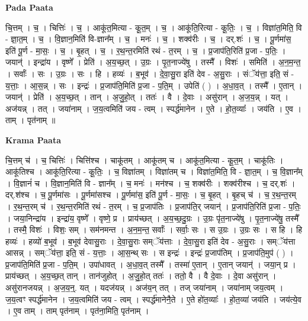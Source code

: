 \documentclass[17pt]{extarticle}
\begin{document}
\textbf{Pada Paata} \newline

चि॒त्तम् । च॒ । चित्तिः॑ । च॒ । आकू॑त॒मित्या - कू॒त॒म् । च॒ । आकू॑ति॒रित्या - कू॒तिः॒ । च॒ । विज्ञा॑त॒मिति॒ वि - ज्ञा॒त॒म् । च॒ । वि॒ज्ञान॒मिति॑ वि-ज्ञान᳚म् । च॒ । मनः॑ । च॒ । शक्व॑रीः । च॒ । दर्.शः॑ । च॒ । पू॒र्णमा॑स॒ इति॑ पू॒र्ण - मा॒सः॒ । च॒ । बृ॒हत् । च॒ । र॒थ॒न्त॒रमिति॑ रथं - त॒रम् । च॒ । प्र॒जाप॑ति॒रिति॑ प्र॒जा - प॒तिः॒ । जयान्॑ । इन्द्रा॑य । वृष्णे᳚ । प्रेति॑ । अ॒य॒च्छ॒त् । उ॒ग्रः । पृ॒त॒नाज्ये॑षु । तस्मै᳚ । विशः॑ । समिति॑ । अ॒न॒म॒न्त॒ । सर्वाः᳚ । सः । उ॒ग्रः । सः । हि । हव्यः॑ । ब॒भूव॑ । दे॒वा॒सु॒रा इति॑ देव - अ॒सु॒राः । संॅय॑त्ता॒ इति॒ सं - य॒त्ताः॒ । आ॒स॒न्न् । सः । इन्द्रः॑ । प्र॒जाप॑ति॒मिति॑ प्र॒जा - प॒ति॒म् । उपेति॑ ( ) । अ॒धा॒व॒त् । तस्मै᳚ । ए॒तान् । जयान्॑ । प्रेति॑ । अ॒य॒च्छ॒त् । तान् । अ॒जु॒हो॒त् । ततः॑ । वै । दे॒वाः । असु॑रान् । अ॒ज॒य॒न्न् । यत् । अज॑यन्न् । तत् । जया॑नाम् । ज॒य॒त्वमिति॑ जय - त्वम् । स्पर्द्ध॑मानेन । ए॒ते । हो॒त॒व्याः᳚ । जय॑ति । ए॒व । ताम् । पृत॑नाम् ॥  \newline


\textbf{Krama Paata} \newline

चि॒त्तम् च॑ । च॒ चित्तिः॑ । चित्ति॑श्च । चाकू॑तम् । आकू॑तम् च । आकू॑त॒मित्या - कू॒त॒म् । चाकू॑तिः । आकू॑तिश्च । आकू॑ति॒रित्या - कू॒तिः॒ । च॒ विज्ञा॑तम् । विज्ञा॑तम् च । विज्ञा॑त॒मिति॒ वि - ज्ञा॒त॒म् । च॒ वि॒ज्ञान᳚म् । वि॒ज्ञानं॑ च । वि॒ज्ञान॒मिति॑ वि - ज्ञान᳚म् । च॒ मनः॑ । मन॑श्च । च॒ शक्व॑रीः । शक्व॑रीश्च । च॒ दर्.शः॑ । दर्.श॑श्च । च॒ पू॒र्णमा॑सः । पू॒र्णमा॑सश्च । पू॒र्णमा॑स॒ इति॑ पू॒र्ण - मा॒सः॒ । च॒ बृ॒हत् । बृ॒हच् च॑ । च॒ र॒थ॒न्त॒रम् । र॒थ॒न्त॒रम् च॑ । र॒थ॒न्त॒रमिति॑ रथं - त॒रम् । च॒ प्र॒जाप॑तिः । प्र॒जाप॑ति॒र् जयान्॑ । प्र॒जाप॑ति॒रिति॑ प्र॒जा - प॒तिः॒ । जया॒निन्द्रा॑य । इन्द्रा॑य॒ वृष्णे᳚ । वृष्णे॒ प्र । प्राय॑च्छत् । अ॒य॒च्छ॒दु॒ग्रः । उ॒ग्रः पृ॑त॒नाज्ये॑षु । पृ॒त॒नाज्ये॑षु॒ तस्मै᳚ । तस्मै॒ विशः॑ । विशः॒ सम् । सम॑नमन्त । अ॒न॒म॒न्त॒ सर्वाः᳚ । सर्वाः॒ सः । स उ॒ग्रः । उ॒ग्रः सः । स हि । हि हव्यः॑ । हव्यो॑ ब॒भूव॑ । ब॒भूव॑ देवासु॒राः । दे॒वा॒सु॒राः सम्ॅय॑त्ताः । दे॒वा॒सु॒रा इति॑ देव - अ॒सु॒राः । सम्ॅय॑त्ता आसन्न् । सम्ॅय॑त्ता॒ इति॒ सं - य॒त्ताः॒ । आ॒स॒न्थ् सः । स इन्द्रः॑ । इन्द्रः॑ प्र॒जाप॑तिम् । प्र॒जाप॑ति॒मुप॑ ( ) । प्र॒जाप॑ति॒मिति॑ प्र॒जा - प॒ति॒म् । उपा॑धावत् । अ॒धा॒व॒त् तस्मै᳚ । तस्मा॑ ए॒तान् । ए॒तान् जयान्॑ । जया॒न् प्र । प्राय॑च्छत् । अ॒य॒च्छ॒त् तान् । तान॑जुहोत् । अ॒जु॒हो॒त् ततः॑ । ततो॒ वै । वै दे॒वाः । दे॒वा असु॑रान् । असु॑रानजयन्न् । अ॒ज॒य॒न्॒. यत् । यदज॑यन्न् । अज॑य॒न् तत् । तज् जया॑नाम् । जया॑नाम् जय॒त्वम् । ज॒य॒त्वꣳ स्पर्द्ध॑मानेन । ज॒य॒त्वमिति॑ जय - त्वम् । स्पर्द्ध॑मानेनै॒ते । ए॒ते हो॑त॒व्याः᳚ । हो॒त॒व्या॑ जय॑ति । जय॑त्ये॒व । ए॒व ताम् । ताम् पृत॑नाम् । पृत॑ना॒मिति॒ पृत॑नाम् । \newline
\end{document}
